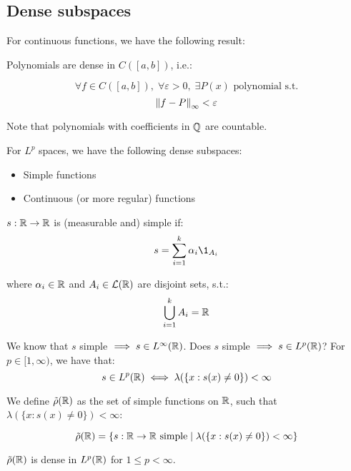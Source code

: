 \subsection{Dense subspaces}

For continuous functions, we have the following result:\\

\begin{ftheorem}
    Polynomials are dense in $C([a, b])$, i.e.:

    $$\forall f \in C([a, b]), \; \forall \varepsilon > 0, \; \exists P(x) \text{ polynomial s.t.}$$
    $$\left\|f - P\right\|_{\infty} < \varepsilon$$

    Note that polynomials with coefficients in $\mathbb{Q}$ are countable.
\end{ftheorem}
\vspace{1em}

For $L^p$ spaces, we have the following dense subspaces:
\begin{itemize}
    \item Simple functions
    \item Continuous (or more regular) functions
\end{itemize}

\begin{note}[Recall]
    $s: \mathbb{R} \to \mathbb{R}$ is (measurable and) simple if:
    $$s = \sum_{i=1}^k \alpha_i \1_{A_i}$$

    where $\alpha_i \in \mathbb{R}$ and $A_i \in \mathcal{L}(\mathbb{R})$ are disjoint sets, s.t.:
    $$\bigcup_{i=1}^k A_i = \mathbb{R}$$

    We know that $s$ simple $\implies s \in L^{\infty}(\mathbb{R})$. Does $s$ simple $\implies s \in L^p(\mathbb{R})$?
    For $p \in [1, \infty)$, we have that:
    $$s \in L^p(\mathbb{R}) \iff \lambda(\{x: s(x) \neq 0\}) < \infty$$

\end{note}

\begin{fdefinition}
    We define $\tilde{\rho}(\mathbb{R})$ as the set of simple functions on $\mathbb{R}$,
    such that $\lambda(\{x: s(x) \neq 0\}) < \infty$:

    $$\tilde{\rho}(\mathbb{R}) = \{s: \mathbb{R} \to \mathbb{R} \text{ simple} \; | \; \lambda(\{x: s(x) \neq 0\}) < \infty\}$$
\end{fdefinition}

\begin{ftheorem}
    $\tilde{\rho}(\mathbb{R})$ is dense in $L^p(\mathbb{R})$ for $1 \leq p < \infty$.
\end{ftheorem}

